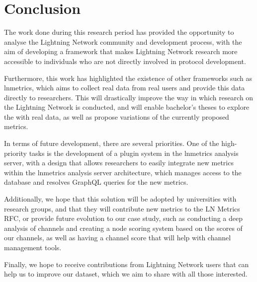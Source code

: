 \chapter{Conclusion}
\label{chap:conclusion}

The work done during this research period has provided the opportunity
to analyse the Lightning Network community and development process,
with the aim of developing a framework that makes Lightning Network
research more accessible to individuals who are not directly
involved in protocol development.

Furthermore, this work has highlighted the existence of other
frameworks such as lnmetrics, which aims to collect real data from
real users and provide this data directly to researchers. This will
drastically improve the way in which research on the Lightning Network is
conducted, and will enable bachelor's theses to explore the {\LN}
with real data, as well as propose variations of the currently proposed metrics.

In terms of future development, there are several priorities.
One of the high-priority tasks is the development of a plugin system
in the lnmetrics analysis server, with a design that allows researchers to easily
integrate new metrics within the lnmetrics analysis server architecture,
which manages access to the database and resolves GraphQL queries for the new metrics.

Additionally, we hope that this solution will be adopted by universities with {\LN}
research groups, and that they will contribute new metrics to the LN Metrics RFC,
or provide future evolution to our case study, such as conducting a deep analysis
of channels and creating a node scoring system based on the scores of our channels,
as well as having a channel score that will help with channel management tools.

Finally, we hope to receive contributions from Lightning Network users that can
help us to improve our dataset, which we aim to share with all those interested.
